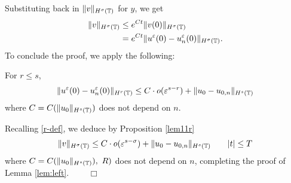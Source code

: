 Substituting back in $\|v\|_{H^{\sigma}(\mathbb{T})}$ for $y$, we get
\begin{equation*}
	\begin{split}
		\|v\|_{H^{\sigma}(\mathbb{T})}
		& \le e^{C t}\|v(0)\|_{H^{\sigma}(\mathbb{T})}
		\\
		& = e^{C t}\|u^\varepsilon(0) - u^\varepsilon_n(0) \|_{H^{\sigma}(\mathbb{T})}.
	\end{split}
\end{equation*}
To conclude the proof, we apply the following:
\begin{proposition}
		\label{lem11r}
	For $r \le s$,
	\begin{equation}
		\begin{split}
			\|u^\varepsilon(0) - u_n^\varepsilon (0) \|_{H^r(\mathbb{T})} \le C
			\cdot o(\varepsilon^{s-r}) + \|u_0 - u_{0,n} \|_{H^s(\mathbb{T})}
			\label{3w}
		\end{split}
	\end{equation}
	where $C=C(\|u_0\|_{H^s(\mathbb{T})})$ does not depend on $n$.
\end{proposition}
%
%
Recalling \eqref{r-def}, we deduce by Proposition \ref{lem11r}
\begin{equation*}
	\begin{split}
		\|v\|_{H^{\sigma}(\mathbb{T})} \le C \cdot o(\varepsilon^{s - \sigma}) + \|u_0 -
		u_{0,n} \|_{H^s(\mathbb{T})} \qquad |t| \le T
	\end{split}
\end{equation*}
where $C=C(\|u_0\|_{H^s(\mathbb{T})}), \ R)$ does not depend
on $n$, completing the proof of Lemma \ref{lem:left}. $\qquad \Box$
%
%
